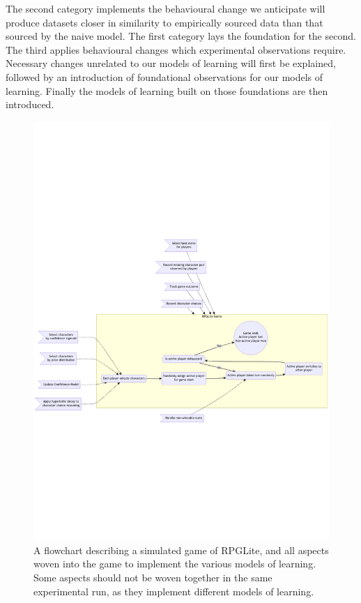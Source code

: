 The second category implements the behavioural change we anticipate will produce
datasets closer in similarity to empirically sourced data than that sourced by
the naive model. The first category lays the foundation for the second. The
third applies behavioural changes which experimental observations require.
Necessary changes unrelated to our models of learning will first be explained,
followed by an introduction of foundational observations for our models of
learning. Finally the models of learning built on those foundations are then
introduced.

\begin{figure}
  \centering
  \includegraphics[width=\columnwidth]{50_optimisation_with_aspects/diagrams/aspect_applied_model.png}
  \caption{A flowchart describing a simulated game of RPGLite, and all aspects woven into the game to implement the various models of learning. Some aspects should not be woven together in the same experimental run, as they implement different models of learning.}
  \label{fig:all_aspects_applied}
\end{figure}


